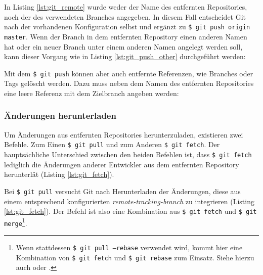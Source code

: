 
In Listing \ref{lst:git_remote} wurde weder der Name des entfernten Repositories,
noch der des verwendeten Branches angegeben. In diesem Fall entscheidet Git
nach der vorhandenen Konfiguration selbst und ergänzt zu \texttt{\$ git
push origin master}. Wenn der Branch in dem entfernten Repository einen anderen
Namen hat oder ein neuer Branch unter einem anderen Namen angelegt werden soll,
kann dieser Vorgang wie in Listing \ref{lst:git_push_other} durchgeführt werden:


Mit dem \texttt{\$ git push} können aber auch entfernte Referenzen, wie
Branches oder Tags gelöscht werden. Dazu muss neben dem Namen des entfernten
Repositories eine leere Referenz mit dem Zielbranch angeben werden:
 \cite[S.~153-155]{gitosp}


\subsubsection{Änderungen herunterladen}
Um Änderungen aus entfernten Repositories herunterzuladen, existieren zwei
Befehle. Zum Einen \texttt{\$ git pull} und zum Anderen \texttt{\$ git fetch}.
Der hauptsächliche Unterschied zwischen den beiden Befehlen ist, dass
\texttt{\$ git fetch} lediglich die Änderungen anderer Entwickler aus dem entfernten
Repository herunterlät (Listing \ref{lst:git_fetch}).


Bei \texttt{\$ git pull} versucht Git nach Herunterladen der
Änderungen, diese aus einem entsprechend konfigurierten
\textit{remote-tracking-branch} zu integrieren (Listing \ref{lst:git_fetch}).
Der Befehl ist also eine Kombination aus \texttt{\$ git fetch} und \texttt{\$
git merge}\footnote{Wenn stattdessen \texttt{\$ git pull --rebase} verwendet
wird, kommt hier eine Kombination von \texttt{\$ git fetch} und \texttt{\$ git
rebase} zum Einsatz. Siehe hierzu auch \cite[144-152]{gitosp} oder
\cite[85-88]{progit}.}. \cite[144-152]{gitosp}


